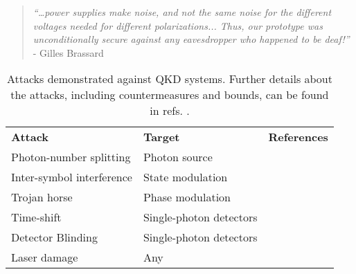


\begin{quote}
\textit{``…power supplies make noise, and not the same noise for the different voltages needed for different polarizations... Thus, our prototype was unconditionally secure against any eavesdropper who happened to be deaf!''} - Gilles Brassard \cite{Brassard2005}
\end{quote}

\begin{table}[t]
\centering
\begin{tabular}{lll}
	\textbf{Attack}\hspace{4cm} & \textbf{Target}\hspace{4cm}  & \textbf{References}\\ 
	Photon-number splitting    & Photon source          & 	\cite{Norbert2000Security, Brassard2000Limitations}  \\
	Inter-symbol interference      & State modulation      & 	\cite{yoshino2018quantum}   \\
	Trojan horse & Phase modulation      &   \cite{Gisin2006, jain2014trojan, sajeed2017invisible} \\
	Time-shift 		&	Single-photon detectors	& \cite{Qi2007Time, Zhao2008Quantum} \\
	Detector Blinding	&	Single-photon detectors 	&	\cite{Lydersen2010a, Gerhardt2011a}	\\
	Laser damage	&	Any	& \cite{Bugge2014Laser, Makarov2016Creation}
\end{tabular}
\caption[Attacks demonstrated against QKD systems]{Attacks demonstrated against \acs{QKD} systems. Further details about the attacks, including countermeasures and bounds, can be found in refs. \cite{pirandola2019advances, xu2019quantum}.}
\label{tab:hacks}
\end{table}

